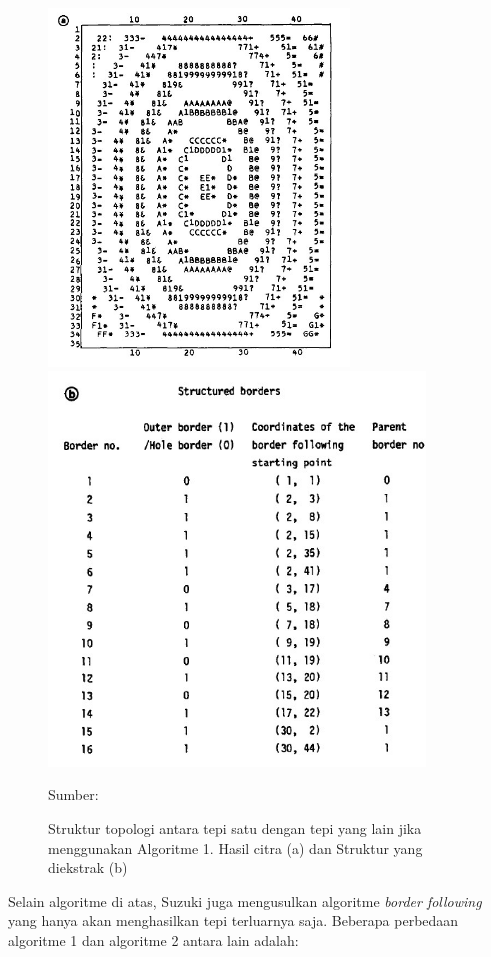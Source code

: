 \begin{enumerate}
        \begin{figure}[H]
        \centering
          \singlespacing
          \captionsetup{justification=centering,margin=0.5cm}
          \includegraphics[width=8cm]{image/topologicalresult.jpg}
          \includegraphics[width=10cm]{image/topologicalstructure.jpg}
          \caption{Struktur topologi antara tepi satu dengan tepi yang lain jika menggunakan Algoritme 1. Hasil citra (a) dan Struktur yang diekstrak (b)}
          \small{Sumber: \citep{Suzuki1985}}
          \label{fig:parentborder}
        \end{figure}
    \end{enumerate}
    
    Selain algoritme di atas, Suzuki juga mengusulkan algoritme \textit{border following} yang hanya akan menghasilkan tepi terluarnya saja. Beberapa perbedaan algoritme 1 dan algoritme 2 antara lain adalah:
    
